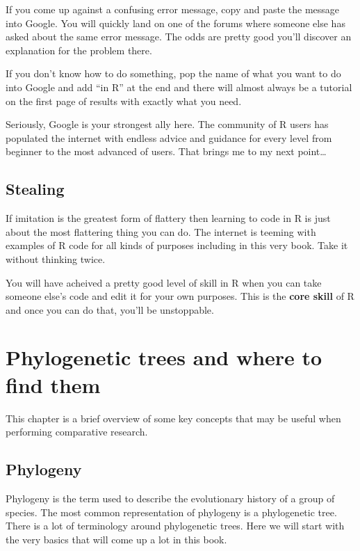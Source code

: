 \documentclass[
]{book}
\begin{document}
If you come up against a confusing error message, copy and paste the message into Google. You will quickly land on one of the forums where someone else has asked about the same error message. The odds are pretty good you'll discover an explanation for the problem there.

If you don't know how to do something, pop the name of what you want to do into Google and add ``in R'' at the end and there will almost always be a tutorial on the first page of results with exactly what you need.

Seriously, Google is your strongest ally here. The community of R users has populated the internet with endless advice and guidance for every level from beginner to the most advanced of users. That brings me to my next point\ldots{}

\hypertarget{stealing}{%
\section{Stealing}\label{stealing}}

If imitation is the greatest form of flattery then learning to code in R is just about the most flattering thing you can do. The internet is teeming with examples of R code for all kinds of purposes including in this very book. Take it without thinking twice.

You will have acheived a pretty good level of skill in R when you can take someone else's code and edit it for your own purposes. This is the \textbf{core skill} of R and once you can do that, you'll be unstoppable.

\hypertarget{phylogenetics}{%
\chapter{Phylogenetic trees and where to find them}\label{phylogenetics}}

This chapter is a brief overview of some key concepts that may be useful when performing comparative research.

\hypertarget{phylogeny}{%
\section{Phylogeny}\label{phylogeny}}

Phylogeny is the term used to describe the evolutionary history of a group of species. The most common representation of phylogeny is a phylogenetic tree. There is a lot of terminology around phylogenetic trees. Here we will start with the very basics that will come up a lot in this book.
\end{document}
